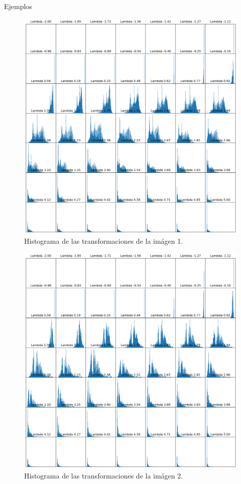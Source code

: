 \documentclass{beamer}
\begin{document}
\begin{frame}{Ejemplos}
    \begin{figure}
        \centering
        \includegraphics[width=\textwidth]{all_lambda_hist_1.png}
        \caption{Histograma de las transformaciones de la im\'agen 1.}
        \label{fig:img_bci_hist_1}
    \end{figure}

    \begin{figure}
        \centering
        \includegraphics[width=\textwidth]{all_lambda_hist_3.png}
        \caption{Histograma de las transformaciones de la im\'agen 2.}
        \label{fig:img_bci_hist_2}
    \end{figure}
\end{frame}
\end{document}

